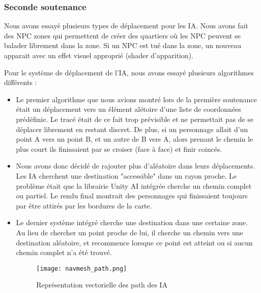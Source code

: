    \subsubsection{Seconde soutenance}


        Nous avons essayé plusieurs types de déplacement pour les IA. Nous avons fait des NPC zones qui permettent de créer des quartiers
        où les NPC peuvent se balader librement dans la zone. Si un NPC est tué dans la zone, un nouveau apparait avec un effet visuel 
        approprié (shader d'apparition).
        \newline

        Pour le système de déplacement de l'IA,
        nous avons essayé plusieurs algorithmes différents :\newline
        
        \begin{itemize}
            \item Le premier algorithme que nous avions montré lors de la première soutenance
            était un déplacement vers un élément alétoire d'une liste de coordonnées prédéfinie.
            Le tracé était de ce fait trop prévisible et ne permettait pas de se déplacer librement en restant discret.
            De plus, si un personnage allait d'un point A vers un point B, et un autre de B vers A,
            alors prenant le chemin le plus court ils finissaient par se croiser (face à face) et finir coincés.
            \newline
            \item Nous avons donc décidé de rajouter plus d'aléatoire dans leurs déplacements.
            Les IA cherchent une destination "accessible" dans un rayon proche.
            Le problème était que la librairie Unity AI intégrée cherche un chemin complet ou partiel.
            Le rendu final montrait des personnages qui finissaient toujours par être attirés par les bordures de la carte.
            \newline

            \item  Le dernier système intégré cherche une destination dans une certaine zone.
            Au lieu de chercher un point proche de lui, il cherche un chemin vers une destination aléatoire, 
            et recommence lorsque ce point est atteint ou si aucun chemin complet n'a été trouvé.

            
            \begin{figure}[hbt!]
                \centering
                \texttt{[image: navmesh\_path.png]}
                \caption{Représentation vectorielle des path des IA}
            \end{figure}
        

        \end{itemize}
        
